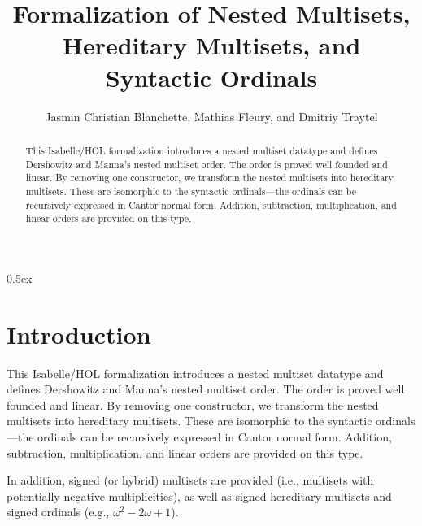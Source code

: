 \documentclass[10pt,a4paper]{article}
\begin{document}
\title{Formalization of Nested Multisets, Hereditary Multisets, and Syntactic Ordinals}
\author{Jasmin Christian Blanchette, Mathias Fleury, and Dmitriy Traytel}

\maketitle

\begin{abstract}
\noindent
This Isabelle/HOL formalization introduces a nested multiset datatype and
defines Dershowitz and Manna's nested multiset order. The order is proved well
founded and linear. By removing one constructor, we transform the nested
multisets into hereditary multisets. These are isomorphic to the syntactic
ordinals---the ordinals can be recursively expressed in Cantor normal form.
Addition, subtraction, multiplication, and linear orders are provided on this
type.
\end{abstract}

\tableofcontents

\parindent 0pt
\parskip 0.5ex

\section{Introduction}

This Isabelle/HOL formalization introduces a nested multiset datatype and
defines Dershowitz and Manna's nested multiset order. The order is proved well
founded and linear. By removing one constructor, we transform the nested
multisets into hereditary multisets. These are isomorphic to the syntactic
ordinals---the ordinals can be recursively expressed in Cantor normal form.
Addition, subtraction, multiplication, and linear orders are provided on this
type.

In addition, signed (or hybrid) multisets are provided (i.e., multisets with
potentially negative multiplicities), as well as signed hereditary multisets
and signed ordinals (e.g., $\omega^2 - 2\omega + 1$).




%
%

%
%
\end{document}
